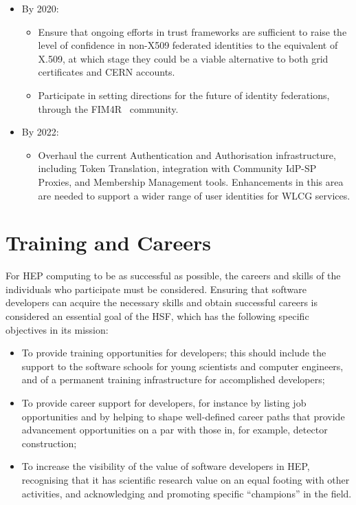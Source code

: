 \begin{itemize}
\item
By 2020:
\begin{itemize}
\item
  Ensure that ongoing efforts in trust frameworks are sufficient to
  raise the level of confidence in non-X509 federated identities to the
  equivalent of X.509, at which stage they could be a viable alternative
  to both grid certificates and CERN accounts.
\item
  Participate in setting directions for the future of identity
  federations, through the FIM4R~\cite{FIM4R} community.
\end{itemize}
\item
By 2022:
\begin{itemize}
\item
  Overhaul the current Authentication and Authorisation infrastructure,
  including Token Translation, integration with Community IdP-SP
  Proxies, and Membership Management tools. Enhancements in this area
  are needed to support a wider range of user identities for WLCG
  services.
\end{itemize}
\end{itemize}

\hypertarget{training-and-careers}{%
\section{Training and Careers}\label{training-and-careers}}

For HEP computing to be as successful as possible, the careers and
skills of the individuals who participate must be considered. Ensuring
that software developers can acquire the necessary skills and obtain
successful careers is considered an essential goal of the HSF, which has
the following specific objectives in its mission:

\begin{itemize}
\item
  To provide training opportunities for developers; this should include
  the support to the software schools for young scientists and computer
  engineers, and of a permanent training infrastructure for accomplished
  developers;
\item
  To provide career support for developers, for instance by listing job
  opportunities and by helping to shape well-defined career paths that
  provide advancement opportunities on a par with those in, for example,
  detector construction;
\item
  To increase the visibility of the value of software developers in HEP,
  recognising that it has scientific research value on an equal footing
  with other activities, and acknowledging and promoting specific
  ``champions'' in the field.
\end{itemize}

